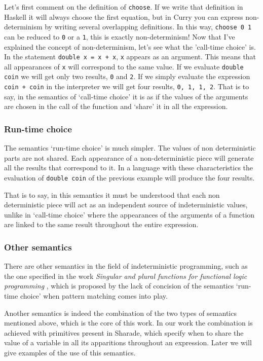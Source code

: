 \documentclass[class=article, crop=false]{standalone}
\begin{document}
Let's first comment on the definition of \verb`choose`. If we write that definition in
Haskell it will always choose the first equation, but in Curry you can express
non-determinism by writing several overlapping definitions. In this way, \verb`choose 0 1`
can be reduced to \verb`0` or a \verb`1`, this is exactly non-determinism! Now that
I've explained the concept of non-determinism, let's see what the 'call-time choice' is. In
the statement \verb`double x = x + x`, \verb`x` appears as an argument. This means that all
appearances of \verb`x` will correspond to the same value. If we evaluate \verb`double coin`
we will get only two results, \verb`0` and \verb`2`. If we simply evaluate the expression 
\verb`coin + coin` in the interpreter we will get four results, \verb`0, 1, 1, 2`. That is to
say, in the semantics of `call-time choice' it is as if the values of the arguments are
chosen in the call of the function and `share' it in all the expression.

\subsubsection{Run-time choice}
The semantics `run-time choice' is much simpler. The values of non deterministic parts are
not shared. Each appearance of a non-deterministic piece will generate all the results that
correspond to it. In a language with these characteristics the evaluation of
\verb`double coin` of the previous example will produce the four results.

That is to say, in this semantics it must be understood that each non deterministic piece
will act as an independent source of indeterministic values, unlike in `call-time choice'
where the appearances of the arguments of a function are linked to the same result throughout
the entire expression.

\subsubsection{Other semantics}
There are other semantics in the field of indeterministic programming, such as the one
specified in the work \textit{Singular and plural functions for functional logic programming}
\cite{riesco2014singular}, which is proposed by the lack of concision of the semantics
`run-time choice' when pattern matching comes into play.

Another semantics is indeed the combination of the two types of semantics mentioned above,
which is the core of this work. In our work the combination is achieved with primitives
present in Sharade, which specify when to share the value of a variable in all its
apparitions throughout an expression. Later we will give examples of the use of this
semantics.
\end{document}
